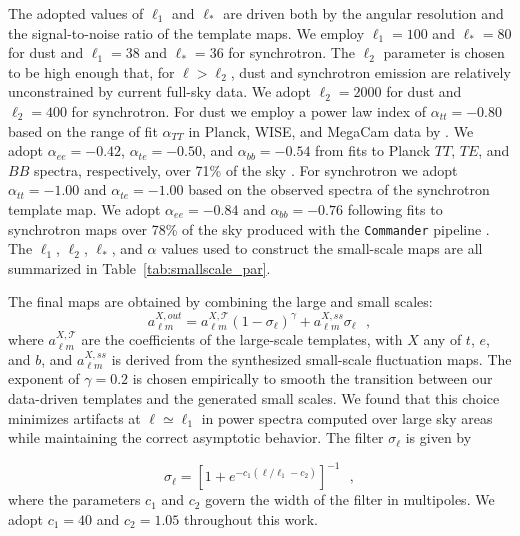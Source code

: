\documentclass[twocolumn]{aastex631}
\begin{document}
The adopted values of $\ell_1$ and $\ell_*$ are driven both by the angular resolution and the signal-to-noise ratio of the template maps. We employ $\ell_1=100$ and $\ell_*=80$ for dust and $\ell_1=38$ and $\ell_*=36$ for synchrotron. The $\ell_2$ parameter is chosen to be high enough that, for $\ell > \ell_2$, dust and synchrotron emission are relatively unconstrained by current full-sky data. We adopt  $\ell_2=2000$ for dust and $\ell_2 = 400$ for synchrotron. For dust we employ a power law index of $\alpha_{tt} = -0.80$ based on the range of fit $\alpha_{TT}$ in Planck, WISE, and MegaCam data by \citet{Miville-Deschenes:2016}. We adopt $\alpha_{ee} = -0.42$, $\alpha_{te} = -0.50$, and $\alpha_{bb} = -0.54$ from fits to Planck $TT$, $TE$, and $BB$ spectra, respectively, over 71\% of the sky \citep{planck2016-l11A}. For synchrotron we adopt $\alpha_{tt} = -1.00$ and $\alpha_{te} = -1.00$ based on the observed spectra of the synchrotron template map. We adopt $\alpha_{ee} = -0.84$ and $\alpha_{bb} = -0.76$ following fits to synchrotron maps over 78\% of the sky produced with the \texttt{Commander} pipeline \citep{planck2016-l04}. The $\ell_1$, $\ell_2$, $\ell_*$, and $\alpha$ values used to construct the small-scale maps are all summarized in Table~\ref{tab:smallscale_par}.

The final maps are obtained by combining the large and small scales: 
\begin{equation} \label{eq:filter}
    a_{\ell m }^{X, out}=  a_{\ell m }^{X, \mathcal{T}} \left(1-\sigma_\ell\right)^{\gamma} + a_{\ell m }^{X, ss} \sigma_\ell
    ~~~, 
\end{equation}
where $a_{\ell m }^{X, \mathcal{T}}$ are the coefficients of the large-scale templates, with $X$ any of $t$, $e$, and $b$, and $a_{\ell m }^{X, ss}$ is derived from the synthesized small-scale fluctuation maps. The exponent of $\gamma = 0.2$ is chosen empirically to smooth the transition between our data-driven templates and the generated small scales. We found that this choice minimizes artifacts at $\ell \simeq \ell_1$ in power spectra computed over large sky areas while maintaining the correct asymptotic behavior. The filter $\sigma_\ell$ is given by

\begin{equation} \label{eq:filter2}
\sigma_\ell  = \left[1+  e^{ -c_1 (\ell/ \ell_1  -c_2 )}\right]^{-1}  
~~~,
\end{equation}
where the parameters $c_1$ and $c_2$ govern the width of the filter in multipoles. We adopt $c_1=40$ and $c_2=1.05$ throughout this work.
\end{document}
